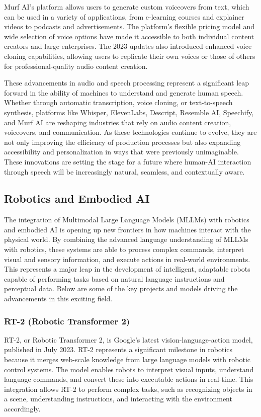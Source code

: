 Murf AI’s platform allows users to generate custom voiceovers from text, which can be used in a variety of applications, from e-learning courses and explainer videos to podcasts and advertisements. 
The platform’s flexible pricing model and wide selection of voice options have made it accessible to both individual content creators and large enterprises. 
The 2023 updates also introduced enhanced voice cloning capabilities, allowing users to replicate their own voices or those of others for professional-quality audio content creation.

These advancements in audio and speech processing represent a significant leap forward in the ability of machines to understand and generate human speech. 
Whether through automatic transcription, voice cloning, or text-to-speech synthesis, platforms like Whisper, ElevenLabs, Descript, Resemble AI, Speechify, and Murf AI are reshaping industries that rely on audio content creation, voiceovers, and communication. 
As these technologies continue to evolve, they are not only improving the efficiency of production processes but also expanding accessibility and personalization in ways that were previously unimaginable. 
These innovations are setting the stage for a future where human-AI interaction through speech will be increasingly natural, seamless, and contextually aware.

\subsection{Robotics and Embodied AI}

The integration of Multimodal Large Language Models (MLLMs) with robotics and embodied AI is opening up new frontiers in how machines interact with the physical world. 
By combining the advanced language understanding of MLLMs with robotics, these systems are able to process complex commands, interpret visual and sensory information, and execute actions in real-world environments. 
This represents a major leap in the development of intelligent, adaptable robots capable of performing tasks based on natural language instructions and perceptual data. 
Below are some of the key projects and models driving the advancements in this exciting field.

\subsubsection{RT-2 (Robotic Transformer 2)}

RT-2, or Robotic Transformer 2, is Google’s latest vision-language-action model, published in July 2023. 
RT-2 represents a significant milestone in robotics because it merges web-scale knowledge from large language models with robotic control systems. 
The model enables robots to interpret visual inputs, understand language commands, and convert these into executable actions in real-time. 
This integration allows RT-2 to perform complex tasks, such as recognizing objects in a scene, understanding instructions, and interacting with the environment accordingly.

